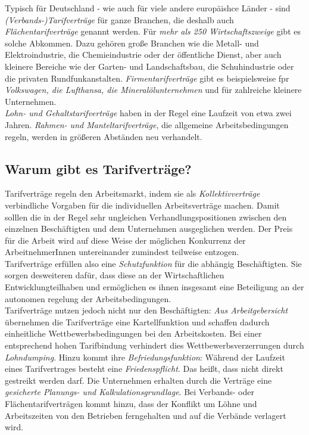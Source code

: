 \documentclass[a4paper, 12pt]{report}
\begin{document}
Typisch für Deutschland - wie auch für viele andere europäishce Länder - sind
\emph{(Verbands-)Tarifverträge} für ganze Branchen, die deshalb auch
\emph{Flächentarifverträge} genannt werden. Für \emph{mehr als 250
Wirtschaftszweige} gibt es solche Abkommen. Dazu gehören große Branchen wie die
Metall- und Elektroindustrie, die Chemieindustrie oder der öffentliche Dienst,
aber auch kleinere Bereiche wie der Garten- und Landschaftsbau, die
Schuhindustrie oder die privaten Rundfunkanstalten. \emph{Firmentarifverträge}
gibt es beispielsweise fpr \emph{Volkswagen, die Lufthansa, die
Mineralölunternehmen} und für zahlreiche kleinere Unternehmen. \\

\emph{Lohn- und Gehaltstarifverträge} haben in der Regel eine Laufzeit von etwa
zwei Jahren. \emph{Rahmen- und Manteltarifverträge}, die allgemeine
Arbeitsbedingungen regeln, werden in größeren Abständen neu verhandelt.

\subsection{Warum gibt es Tarifverträge?}

Tarifverträge regeln den Arbeitsmarkt, indem sie als \emph{Kollektivverträge}
verbindliche Vorgaben für die individuellen Arbeitsverträge machen. Damit
solllen die in der Regel sehr ungleichen Verhandlungspositionen zwischen den
einzelnen Beschäftigten und dem Unternehmen ausgeglichen werden. Der Preis für
die Arbeit wird auf diese Weise der möglichen Konkurrenz der ArbeitnehmerInnen
untereinander zumindest teilweise entzogen. \\

Tarifverträge erfüllen also eine \emph{Schutzfunktion} für die abhängig
Beschäftigten. Sie sorgen desweiteren dafür, dass diese an der Wirtschaftlichen
Entwicklungteilhaben und ermöglichen es ihnen insgesamt eine Beteiligung an der
autonomen regelung der Arbeitsbedingungen. \\

Tarifverträge nutzen jedoch nicht nur den Beschäftigten: \emph{Aus
Arbeitgebersicht} übernehmen die Tarifverträge eine Kartellfunktion und schaffen
dadurch einheitliche Wettbewerbsbedingungen bei den Arbeitskosten. Bei einer
entsprechend hohen Tarifbindung verhindert dies Wettbewerbsverzerrungen durch
\emph{Lohndumping}. Hinzu kommt ihre \emph{Befriedungsfunktion}: Während der
Laufzeit eines Tarifvertrages besteht eine \emph{Friedenspflicht}. Das heißt,
dass nicht direkt gestreikt werden darf. Die Unternehmen erhalten durch die
Verträge eine \emph{gesicherte Planungs- und Kalkulationsgrundlage}. Bei
Verbands- oder Flächentarifverträgen kommt hinzu, dass der Konflikt um Löhne und
Arbeitszeiten von den Betrieben ferngehalten und auf die Verbände verlagert
wird. \\
\end{document}
